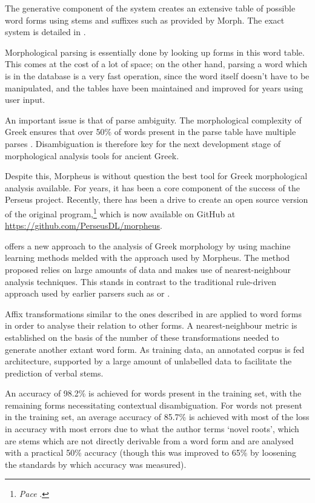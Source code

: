 The generative component of the system creates an extensive table of
possible word forms using stems and suffixes such as provided by
Morph. The exact system is detailed in \cite{crane1991generating}.

Morphological parsing is essentially done by looking up forms in this
word table. This comes at the cost of a lot of space; on the other
hand, parsing a word which is in the database is a very fast
operation, since the word itself doesn't have to be manipulated, and
the tables have been maintained and improved for years using
user input.

An important issue is that of parse ambiguity. The morphological
complexity of Greek ensures that over 50\% of words present in the
parse table have multiple parses \citep{dik2008}. Disambiguation is
therefore key for the next development stage of morphological analysis
tools for ancient Greek.

Despite this, Morpheus is without question the best tool for Greek
morphological analysis available. For years, it has been a core
component of the success of the Perseus project. Recently, there has
been a drive to create an open source version of the original
program,\footnote{\textit{Pace} \cite{blackwell2009}.} which is now
available on GitHub at \url{https://github.com/PerseusDL/morpheus}.

\cite{lee2008nearest} offers a new approach to the analysis of Greek
morphology by using machine learning methods melded with the approach
used by Morpheus. The method proposed relies on large amounts of data
and makes use of nearest-neighbour analysis techniques. This stands in
contrast to the traditional rule-driven approach used by earlier
parsers such as \cite{packard1973computer} or
\cite{crane1991generating}.

Affix transformations similar to the ones described in
\cite{packard1973computer} are applied to word forms in order to analyse their
relation to other forms. A nearest-neighbour metric is established on
the basis of the number of these transformations needed to generate
another extant word form. As training data, an annotated corpus is fed 
architecture, supported by a large amount of unlabelled data to
facilitate the prediction of verbal stems.

An accuracy of 98.2\% is achieved for words present in the training
set, with the remaining forms necessitating contextual
disambiguation. For words not present in the training set, an average
accuracy of 85.7\% is achieved with most of the loss in accuracy with
most errors due to what the author terms `novel roots', which are
stems which are not directly derivable from a word form and are
analysed with a practical 50\% accuracy (though this was improved to
65\% by loosening the standards by which accuracy was measured).

